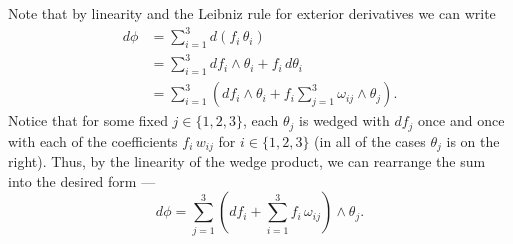 \documentclass[12 pt, letterpaper]{hmcpset}
\begin{document}
\begin{solution}
	Note that by linearity and the Leibniz rule for exterior derivatives we can write
	\[
		\begin{split}
			d \phi & = \sum_{i = 1}^{3} d(f_{i} \, \theta_{i}) \\
			       & = \sum_{i = 1}^{3} df_{i} \wedge \theta_{i} + f_{i} \, d\theta_{i} \\
			       & = \sum_{i = 1}^{3} \left ( df_{i} \wedge \theta_{i} + f_{i} \sum_{j = 1}^{3} \omega_{ij} \wedge \theta_{j} \right ).
		\end{split}
	\]
	Notice that for some fixed $j \in \{ 1, 2, 3 \}$, each $\theta_{j}$ is wedged with $df_{j}$ once and once with each of the coefficients $f_{i} \, w_{ij}$ for $i \in \{ 1, 2, 3 \}$ (in all of the cases $\theta_{j}$ is on the right). Thus, by the linearity of the wedge product, we can rearrange the sum into the desired form ---
	\[
		d \phi = \sum_{j = 1}^{3} \left ( df_{i} + \sum_{i = 1}^{3} f_{i} \, \omega_{ij} \right ) \wedge \theta_{j}.
	\]
\end{solution}
\end{document}
